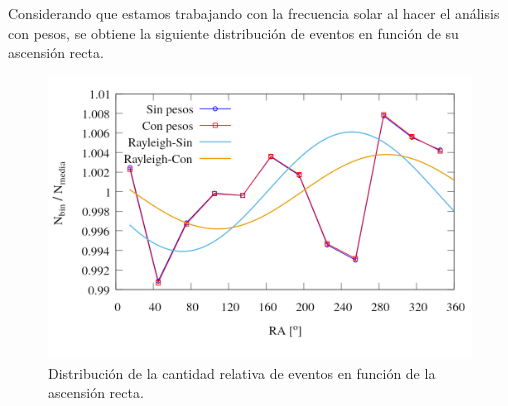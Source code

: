 Considerando que estamos trabajando con la frecuencia solar al hacer el análisis con pesos, se obtiene la siguiente distribución de eventos en función de su ascensión recta.
\begin{figure}[H]
	\centering
	\includegraphics[width=\linewidth]{eventos_clasificados_por_RA_v2.png}
	\caption{Distribución de la cantidad relativa de eventos en función de la ascensión recta.}
\end{figure}

		

